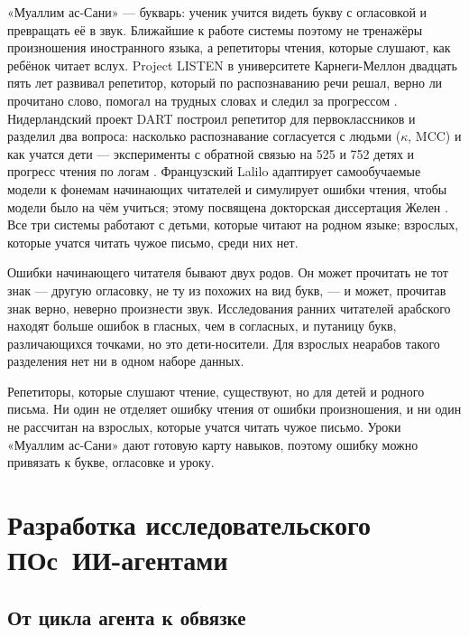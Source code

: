 \documentclass[a4paper,14pt]{extarticle}
\begin{document}
«Муаллим ас-Сани» --- букварь: ученик учится видеть букву с огласовкой и превращать её в звук. Ближайшие к
работе системы поэтому не тренажёры произношения иностранного языка, а репетиторы чтения, которые слушают,
как ребёнок читает вслух. Project LISTEN в университете Карнеги-Меллон двадцать пять лет развивал
репетитор, который по распознаванию речи решал, верно ли прочитано слово, помогал на трудных словах и
следил за прогрессом \cite{SRC-125}. Нидерландский проект DART построил репетитор для первоклассников и
разделил два вопроса: насколько распознавание согласуется с людьми ($\kappa$, MCC) и как учатся дети ---
эксперименты с обратной связью на 525 и 752 детях и прогресс чтения по логам \cite{SRC-130,SRC-131}.
Французский Lalilo адаптирует самообучаемые модели к фонемам начинающих читателей и симулирует ошибки чтения,
чтобы модели было на чём учиться; этому посвящена докторская диссертация Желен \cite{SRC-132,SRC-133}.
Все три системы работают с детьми, которые читают на родном языке; взрослых, которые учатся читать чужое
письмо, среди них нет.

Ошибки начинающего читателя бывают двух родов. Он может прочитать не тот знак --- другую огласовку, не ту из
похожих на вид букв, --- и может, прочитав знак верно, неверно произнести звук. Исследования ранних читателей
арабского находят больше ошибок в гласных, чем в согласных, и путаницу букв, различающихся точками, но это
дети-носители. Для взрослых неарабов такого разделения нет ни в одном наборе данных.

\begin{keybox}[Вывод]
Репетиторы, которые слушают чтение, существуют, но для детей и родного письма. Ни один не отделяет ошибку
чтения от ошибки произношения, и ни один не рассчитан на взрослых, которые учатся читать чужое письмо. Уроки
«Муаллим ас-Сани» дают готовую карту навыков, поэтому ошибку можно привязать к букве, огласовке и уроку.
\end{keybox}

\section[Разработка исследовательского ПО с ИИ-агентами]{Разработка исследовательского ПО\newline с~ИИ-агентами}

\subsection{От цикла агента к обвязке}
\end{document}
